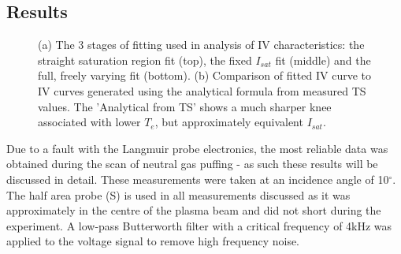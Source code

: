 \documentclass[a4paper, 11pt]{article} %
\begin{document}
\subsection{Results}
	\begin{figure}[b!]
		\vspace{-0pt}
		\caption{
			(a) The 3 stages of fitting used in analysis of IV characteristics: the straight saturation region fit (top), the fixed $I_{sat}$ fit (middle) and the full, freely varying fit (bottom).
			(b) Comparison of fitted IV curve to IV curves generated using the 	analytical formula from measured TS values. 
			The 'Analytical from TS' shows a much sharper knee associated with lower $T_e$, but approximately equivalent $I_{sat}$. 
		}
		\vspace{-15pt}
	\end{figure}
	Due to a fault with the Langmuir probe electronics, the most reliable data was obtained during the scan of neutral gas puffing - as such these results will be discussed in detail.
	These measurements were taken at an incidence angle of 10$^{\circ}$.
	The half area probe (S) is used in all measurements discussed as it was approximately in the centre of the plasma beam and did not short during the experiment.
	A low-pass Butterworth filter with a critical frequency of 4kHz was applied to the voltage signal to remove high frequency noise.
	
\end{document}
